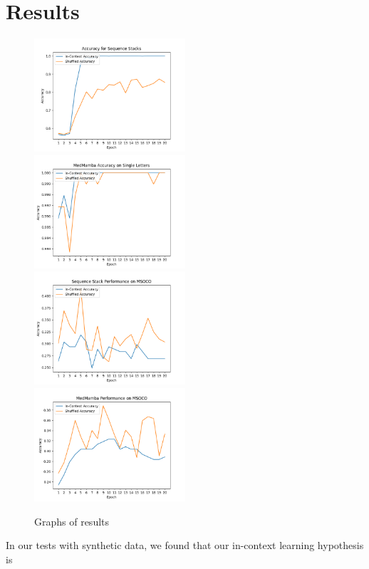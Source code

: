 \section{Results}
\begin{figure}
    \includegraphics[width=0.5\textwidth]{figures/sequence_stack_mnist_like.png}
    \includegraphics[width=0.5\textwidth]{figures/medmamba_mnist_like.png}
    \includegraphics[width=0.5\textwidth]{figures/sequence_stack_mscoco.png}
    \includegraphics[width=0.5\textwidth]{figures/medmamba_mscoco.png}
    \caption{Graphs of results}
    \label{resultslide}
\end{figure}
In our tests with synthetic data, we found that our in-context learning hypothesis is 